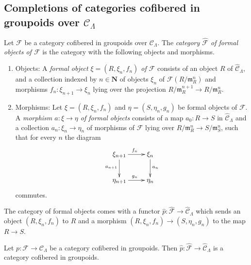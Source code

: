 \subsection{Completions of categories cofibered in groupoids over $\mathcal 
C_{\Lambda}$}
\label{subsection-formal-objects}

\begin{definition}
Let $\mathcal F$ be a category cofibered in groupoids over $\mathcal 
C_{\Lambda}$. The \emph{category $\widehat{\mathcal F}$ of formal objects of 
$\mathcal F$} is the category with the following objects and morphisms.
\begin{enumerate}
\item Objects: A \emph{formal object $\xi = (R, \xi_n, f_n)$ of $\mathcal F$} 
consists of an object $R$ of $\widehat{\mathcal C}_{\Lambda}$, and a collection 
indexed by $n \in \mathbf{N}$ of objects $\xi_{n}$ of $\mathcal 
F(R/\mathfrak{m}_R^{n})$ and morphisms $f_{n}: \xi_{n+1} \rightarrow \xi_{n}$ 
lying over the projection $R/\mathfrak{m}_R^{n+1} \rightarrow 
R/\mathfrak{m}_R^{n}$.

\item Morphisms: Let $\xi = (R,\xi_n,f_n)$ and $\eta = (S,\eta_n,g_n)$ be 
formal objects of $\mathcal F$.  A \emph{morphism $a: \xi \rightarrow \eta$ of 
formal objects} consists of a map $a_0: R \rightarrow S$ in $\widehat{\mathcal 
C}_{\Lambda}$ and a collection $a_n: \xi_n \rightarrow \eta_n$ of morphisms of 
$\mathcal F$ lying over $R/\mathfrak{m}_R^n \rightarrow S/\mathfrak{m}_S^n$, 
such that for every $n$ the diagram
\[
\xymatrix{
\xi_{n+1} \ar[r]^{f_{n}} \ar[d]_{a_{n+1}} & \xi_{n} \ar[d]^{a_{n}} \\
\eta_{n+1} \ar[r]^{g_{n}} & \eta_{n} 
}
\]
commutes.
\end{enumerate}
\end{definition}

\noindent
The category of formal objects comes with a functor $\widehat{p}: 
\widehat{\mathcal F} \rightarrow \widehat{\mathcal C}_{\Lambda}$ which sends an 
object $(R,\xi_n,f_n)$ to $R$ and a morphism $(R,\xi_n,f_n) \rightarrow 
(S,\eta_n,g_n)$ to the map $R \rightarrow S$.

\begin{lemma}
Let $p: \mathcal F \rightarrow \mathcal C_{\Lambda}$ be a category cofibered in 
groupoids.  Then $\widehat{p}: \widehat{\mathcal F} \rightarrow 
\widehat{\mathcal C}_{\Lambda}$ is a category cofibered in groupoids.
\end{lemma}

